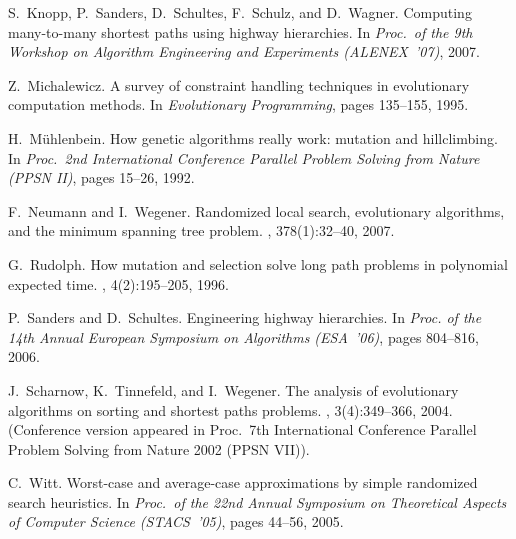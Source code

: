 \documentclass{sig-alternate}
\begin{document}
\begin{thebibliography}{10}
S.~Knopp, P.~Sanders, D.~Schultes, F.~Schulz, and D.~Wagner.
\newblock Computing many-to-many shortest paths using highway hierarchies.
\newblock In {\em Proc.\ of the 9th Workshop on Algorithm Engineering and
  Experiments (ALENEX~'07)}, 2007.

Z.~Michalewicz.
\newblock A survey of constraint handling techniques in evolutionary
  computation methods.
\newblock In {\em Evolutionary Programming}, pages 135--155, 1995.

H.~M{\"u}hlenbein.
\newblock How genetic algorithms really work: mutation and hillclimbing.
\newblock In {\em Proc.\ 2nd International Conference Parallel Problem Solving
  from Nature (PPSN II)}, pages 15--26, 1992.

F.~Neumann and I.~Wegener.
\newblock Randomized local search, evolutionary algorithms, and the minimum
  spanning tree problem.
, 378(1):32--40, 2007.


G.~Rudolph.
\newblock How mutation and selection solve long path problems in polynomial
  expected time.
, 4(2):195--205, 1996.

\vfill\eject 


P.~Sanders and D.~Schultes.
\newblock Engineering highway hierarchies.
\newblock In {\em Proc. of the 14th Annual European Symposium on Algorithms
  (ESA~'06)}, pages 804--816, 2006.

J.~Scharnow, K.~Tinnefeld, and I.~Wegener.
\newblock The analysis of evolutionary algorithms on sorting and shortest paths
  problems.
,
  3(4):349--366, 2004.
\newblock (Conference version appeared in Proc.\ 7th International Conference
  Parallel Problem Solving from Nature 2002 (PPSN VII)).

C.~Witt.
\newblock Worst-case and average-case approximations by simple randomized
  search heuristics.
\newblock In {\em Proc.\ of the 22nd Annual Symposium on Theoretical Aspects of
  Computer Science (STACS~'05)}, pages 44--56, 2005.

\end{thebibliography}
\end{document}
